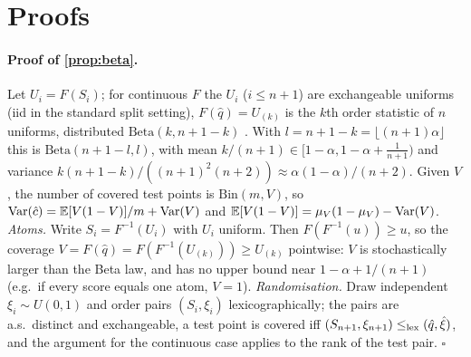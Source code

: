 \section{Proofs}\label{app:proofs}
\paragraph{Proof of \cref{prop:beta}.}
Let $U_i=F(S_i)$; for continuous $F$ the $U_i$ ($i\le n+1$) are exchangeable uniforms (iid in the standard split setting), $F(\hat q)=U_{(k)}$ is the $k$th order statistic of $n$ uniforms, distributed $\mathrm{Beta}(k,n+1-k)$ \citep{vovk2012}. With $l=n+1-k=\lfloor(n+1)\alpha\rfloor$ this is $\mathrm{Beta}(n+1-l,l)$, with mean $k/(n+1)\in[1-\alpha,1-\alpha+\tfrac1{n+1})$ and variance $k(n+1-k)/((n+1)^2(n+2))\approx\alpha(1-\alpha)/(n+2)$. Given $V$, the number of covered test points is $\mathrm{Bin}(m,V)$, so $\mathrm{Var}(\hat c)=\mathbb{E}[V(1-V)]/m+\mathrm{Var}(V)$ and $\mathbb{E}[V(1-V)]=\mu_V(1-\mu_V)-\mathrm{Var}(V)$.
\emph{Atoms.} Write $S_i=F^{-1}(U_i)$ with $U_i$ uniform. Then $F(F^{-1}(u))\ge u$, so the coverage $V=F(\hat q)=F(F^{-1}(U_{(k)}))\ge U_{(k)}$ pointwise: $V$ is stochastically larger than the Beta law, and has no upper bound near $1-\alpha+1/(n+1)$ (e.g.\ if every score equals one atom, $V=1$). \emph{Randomisation.} Draw independent $\xi_i\sim U(0,1)$ and order pairs $(S_i,\xi_i)$ lexicographically; the pairs are a.s.\ distinct and exchangeable, a test point is covered iff $(S_{n+1},\xi_{n+1})\le_{\rm lex}(\hat q,\hat\xi)$, and the argument for the continuous case applies to the rank of the test pair. $\square$

